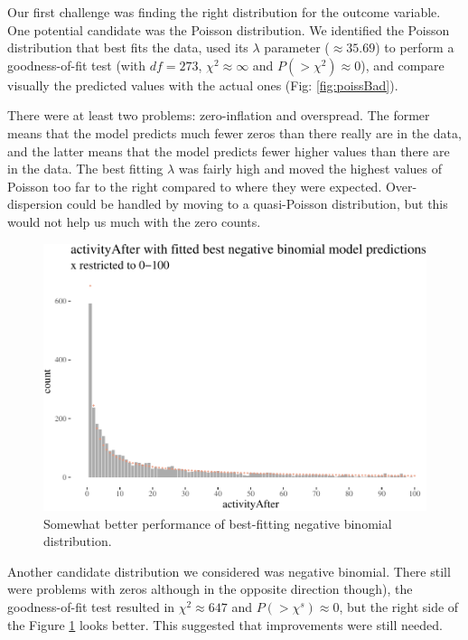 \documentclass[a4paper,fleqn]{cas-dc}
\begin{document}
Our first challenge was finding the right distribution for the outcome
variable. One potential candidate was the Poisson distribution. We
identified the Poisson distribution that best fits the data, used its
\(\lambda\) parameter (\(\approx 35.69\)) to perform a goodness-of-fit
test (with \(df=273\), \(\chi^2 \approx \infty\) and
\(P(>\chi^2)\approx 0\)), and compare visually the predicted values with
the actual ones (Fig: \ref{fig:poissBad}).

There were at least two problems: zero-inflation and overspread. The
former means that the model predicts much fewer zeros than there really
are in the data, and the latter means that the model predicts fewer
higher values than there are in the data. The best fitting \(\lambda\)
was fairly high and moved the highest values of Poisson too far to the
right compared to where they were expected. Over-dispersion could be
handled by moving to a quasi-Poisson distribution, but this would not
help us much with the zero counts.




\begin{figure}
\begin{center}\includegraphics[width=1\linewidth]{images/unnamed-chunk-34-1} \end{center}
\caption{Somewhat better performance of best-fitting negative binomial distribution.}
\label{fig:nbinperf}
\end{figure}

Another candidate distribution we considered was negative binomial.
There still were problems with zeros although in the opposite direction
though), the goodness-of-fit test resulted in \(\chi^2 \approx 647\) and
\(P(>\chi^s)\approx 0\), but the right side of the Figure
\ref{fig:nbinperf} looks better. This suggested that improvements were
still needed.
\end{document}
